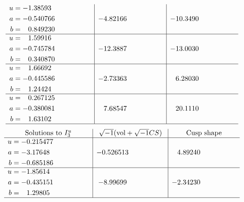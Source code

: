 \documentclass[1p]{elsarticle_modified}
\theoremstyle{definition}
\newcommand{\I}{\sqrt{-1}}
\begin{document}
$$\begin{array}{c|c|c}
\begin{aligned}
u &= -1.38593\phantom{ +0.000000I} \\
a &= -0.540766\phantom{ +0.000000I} \\
b &= \phantom{-}0.849230\phantom{ +0.000000I}\end{aligned}
 & -4.82166\phantom{ +0.000000I} & -10.3490\phantom{ +0.000000I} \\ \hline\begin{aligned}
u &= \phantom{-}1.59916\phantom{ +0.000000I} \\
a &= -0.745784\phantom{ +0.000000I} \\
b &= \phantom{-}0.340870\phantom{ +0.000000I}\end{aligned}
 & -12.3887\phantom{ +0.000000I} & -13.0030\phantom{ +0.000000I} \\ \hline\begin{aligned}
u &= \phantom{-}1.66692\phantom{ +0.000000I} \\
a &= -0.445586\phantom{ +0.000000I} \\
b &= \phantom{-}1.24424\phantom{ +0.000000I}\end{aligned}
 & -2.73363\phantom{ +0.000000I} & \phantom{-}6.28030\phantom{ +0.000000I} \\ \hline\begin{aligned}
u &= \phantom{-}0.267125\phantom{ +0.000000I} \\
a &= -0.380081\phantom{ +0.000000I} \\
b &= \phantom{-}1.63102\phantom{ +0.000000I}\end{aligned}
 & \phantom{-}7.68547\phantom{ +0.000000I} & \phantom{-}20.1110\phantom{ +0.000000I}\\
 \hline 
 \end{array}$$\newpage$$\begin{array}{c|c|c}  
\text{Solutions to }I^u_{3}& \I (\text{vol} + \sqrt{-1}CS) & \text{Cusp shape}\\
 \hline 
\begin{aligned}
u &= -0.215477\phantom{ +0.000000I} \\
a &= -3.17648\phantom{ +0.000000I} \\
b &= -0.685186\phantom{ +0.000000I}\end{aligned}
 & -0.526513\phantom{ +0.000000I} & \phantom{-}4.89240\phantom{ +0.000000I} \\ \hline\begin{aligned}
u &= -1.85614\phantom{ +0.000000I} \\
a &= -0.435151\phantom{ +0.000000I} \\
b &= \phantom{-}1.29805\phantom{ +0.000000I}\end{aligned}
 & -8.99699\phantom{ +0.000000I} & -2.34230\phantom{ +0.000000I}\\
 \hline 
 \end{array}$$\newpage
\end{document}
